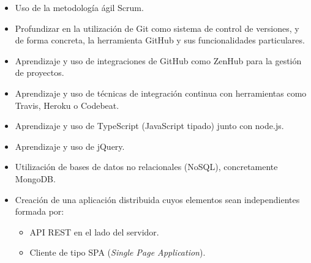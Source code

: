 \begin{itemize}
	\item Uso de la metodología ágil Scrum.
	\item Profundizar en la utilización de Git como sistema de control de versiones, y de forma concreta, la herramienta GitHub y sus funcionalidades particulares.
	\item Aprendizaje y uso de integraciones de GitHub como ZenHub para la gestión de proyectos.
	\item Aprendizaje y uso de técnicas de integración continua con herramientas como Travis, Heroku o Codebeat.
	\item Aprendizaje y uso de TypeScript (JavaScript tipado) junto con node.js.
	\item Aprendizaje y uso de jQuery.
	\item Utilización de bases de datos no relacionales (NoSQL), concretamente MongoDB.
	\item Creación de una aplicación distribuida cuyos elementos sean independientes formada por:
	
	\begin{itemize}
		\item API REST en el lado del servidor.
		\item Cliente de tipo SPA (\textit{Single Page Application}).
	\end{itemize}
\end{itemize}
